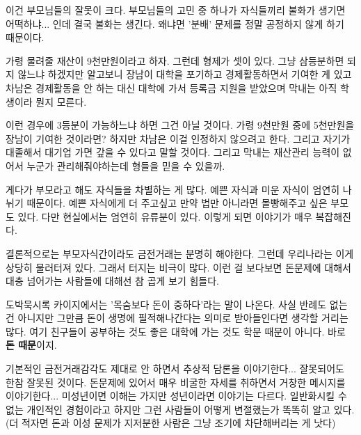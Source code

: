 \vspace{5mm}

이건 부모님들의 잘못이 크다.
부모님들의 고민 중 하나가 자식들끼리 불화가 생기면 어떡하냐... 인데 결국 불화는 생긴다.
왜냐면 '분배' 문제를 정말 공정하지 않게 하기 때문이다.
\vspace{5mm}

가령 물려줄 재산이 9천만원이라고 하자. 그런데 형제가 셋이 있다.
그냥 삼등분하면 되지 않느냐 하겠지만
알고보니 장남이 대학을 포기하고 경제활동하면서 기여한 게 있고
차남은 경제활동을 안 하는 대신 대학에 가서 등록금 지원을 받았으며
막내는 아직 학생이라 뭔지 모른다.
\vspace{5mm}

이런 경우에 3등분이 가능하느냐 하면 그건 아닐 것이다. 가령 9천만원 중에 5천만원을 장남이 기여한 것이라면?
하지만 차남은 이걸 인정하지 않으려고 한다. 그리고 자기가 대졸해서 대기업 가면 갚을 수 있다고 말할 것이다.
그리고 막내는 재산관리 능력이 없어서 누군가 관리해줘야하는데 형들을 믿을 수 있을까.
\vspace{5mm}

게다가 부모라고 해도 자식들을 차별하는 게 많다. 예쁜 자식과 미운 자식이 엄연히 나뉘기 때문이다.
예쁜 자식에게 더 주고싶고 만약 법만 아니라면 몰빵해주고 싶은 부모도 있다. 다만 현실에서는 엄연히 유류분이 있다.
이렇게 되면 이야기가 매우 복잡해진다.
\vspace{5mm}

결론적으로는 부모자식간이라도 금전거래는 분명히 해야한다.
그런데 우리나라는 이게 상당히 물러터져 있다. 그래서 터지는 비극이 많다.
이런 걸 보다보면 돈문제에 대해서 대충 넘어가는 사람들에 대해선 참 곱게 보기 힘들다.
\vspace{5mm}

도박묵시록 카이지에서는 '목숨보다 돈이 중하다'라는 말이 나온다. 사실 반례도 없는 건 아니지만
그만큼 돈이 생명에 필적해나간다는 의미로 받아들인다면 생각할 거리는 많다.
여기 친구들이 공부하는 것도 좋은 대학에 가는 것도 학문 때문이 아니다. 바로 \textbf{돈 때문}이지.
\vspace{5mm}

기본적인 금전거래감각도 제대로 안 하면서 추상적 담론을 이야기한다... 잘못되어도 한참 잘못된 것이다.
돈문제에 있어서 매우 비굴한 자세를 취하면서 거창한 메시지를 이야기한다... 미성년이면 이해는 가지만 성년이라면 이야기는 다르다.
일반화시킬 수 없는 개인적인 경험이라고 하지만 그런 사람들이 어떻게 변절했는가 똑똑히 알고 있다.
(더 적자면 돈과 이성 문제가 지저분한 사람은 그냥 조기에 차단해버리는 게 낫다)
\vspace{5mm}

